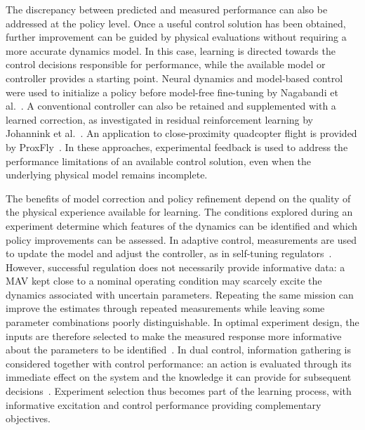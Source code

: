 \documentclass[journal]{IEEEtran}
\begin{document}
The discrepancy between predicted and measured performance can also be addressed at the policy level. Once a useful control solution has been obtained, further improvement can be guided by physical evaluations without requiring a more accurate dynamics model. In this case, learning is directed towards the control decisions responsible for performance, while the available model or controller provides a starting point. Neural dynamics and model-based control were used to initialize a policy before model-free fine-tuning by Nagabandi et al.~\cite{Nagabandi2018}. A conventional controller can also be retained and supplemented with a learned correction, as investigated in residual reinforcement learning by Johannink et al.~\cite{Johannink2019}. An application to close-proximity quadcopter flight is provided by ProxFly~\cite{ProxFly2025}. In these approaches, experimental feedback is used to address the performance limitations of an available control solution, even when the underlying physical model remains incomplete.
 
The benefits of model correction and policy refinement depend on the quality of the physical experience available for learning. The conditions explored during an experiment determine which features of the dynamics can be identified and which policy improvements can be assessed. In adaptive control, measurements are used to update the model and adjust the controller, as in self-tuning regulators~\cite{Astrom1973}. However, successful regulation does not necessarily provide informative data: a MAV kept close to a nominal operating condition may scarcely excite the dynamics associated with uncertain parameters. Repeating the same mission can improve the estimates through repeated measurements while leaving some parameter combinations poorly distinguishable. In optimal experiment design, the inputs are therefore selected to make the measured response more informative about the parameters to be identified~\cite{Mehra1974,Goodwin1977,Hjalmarsson2005}. In dual control, information gathering is considered together with control performance: an action is evaluated through its immediate effect on the system and the knowledge it can provide for subsequent decisions~\cite{Feldbaum1960,Filatov2000,Mesbah2018}. Experiment selection thus becomes part of the learning process, with informative excitation and control performance providing complementary objectives.
\end{document}
